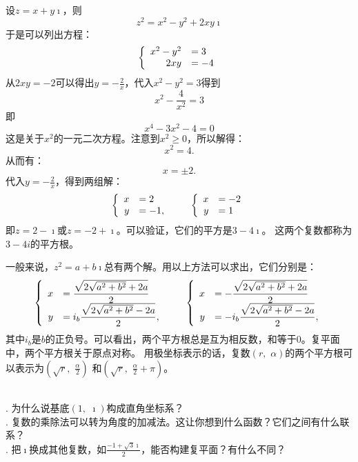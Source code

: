 \documentclass[12pt,UTF8,fontset=none]{ctexbook}
\begin{document}
\begin{so}
    设$z = x + y\imath$，则
    $$ z^2 = x^2 - y^2 + 2xy\imath$$
    于是可以列出方程：
    $$
    \left\{
        \begin{array}[]{rl}
            x^2 - y^2 &= 3 \\
            2xy &= -4
        \end{array}
    \right.
    $$
    从$2xy = -2$可以得出$y = -\frac{2}{x}$，代入$x^2 - y^2 = 3$得到
    $$ x^2 - \frac{4}{x^2} = 3$$
    即
    $$ x^4 - 3x^2 - 4 = 0$$
    这是关于$x^2$的一元二次方程。注意到$x^2 \geqslant 0$，所以解得：
    $$ x^2 = 4. $$
    从而有：
    $$ x = \pm 2 . $$
    代入$y = -\frac{2}{x}$，得到两组解：
    $$
    \left\{
        \begin{array}[]{rl}
            x &= 2 \\
            y &= -1,
        \end{array}
    \right.
    \qquad
    \left\{
        \begin{array}[]{rl}
            x &= -2 \\
            y &= 1
        \end{array}
    \right.
    $$ 
    即$z = 2 - \imath$或$z = -2 + \imath$。可以验证，它们的平方是$3 - 4\imath$。
    这两个复数都称为$3 - 4i$的平方根。
\end{so}

一般来说，$z^2 = a + b\imath$总有两个解。用以上方法可以求出，它们分别是：
$$
\left\{
    \begin{array}[]{rl}
        x &=\displaystyle \frac{\sqrt{2\sqrt{a^2 + b^2} + 2a}}{2} \\
        y &=\displaystyle i_b \frac{\sqrt{2\sqrt{a^2 + b^2} - 2a}}{2},
    \end{array}
\right.
\qquad
\left\{
    \begin{array}[]{rl}
        x &=\displaystyle -\frac{\sqrt{2\sqrt{a^2 + b^2} + 2a}}{2} \\
        y &=\displaystyle -i_b \frac{\sqrt{2\sqrt{a^2 + b^2} - 2a}}{2},
    \end{array}
\right.
$$ 
其中$i_b$是$b$的正负号。可以看出，两个平方根总是互为相反数，和等于$0$。复平面中，两个平方根关于原点对称。
用极坐标表示的话，复数$(r,\,\,\alpha)$的两个平方根可以表示为$\displaystyle\left(\sqrt{r},\,\,\frac{\alpha}{2}\right)$
和$\displaystyle\left(\sqrt{r},\,\,\frac{\alpha}{2}+\pi\right)$。

\begin{sk}
    \mbox{} \\
    . 为什么说基底$(1,\,\,\imath)$构成直角坐标系？\\
    . 复数的乘除法可以转为角度的加减法。这让你想到什么函数？它们之间有什么联系？\\
    . 把$\imath$换成其他复数，如$\displaystyle \frac{-1+\sqrt{3}\imath}{2}$，能否构建复平面？有什么不同？
\end{sk}
\end{document}
